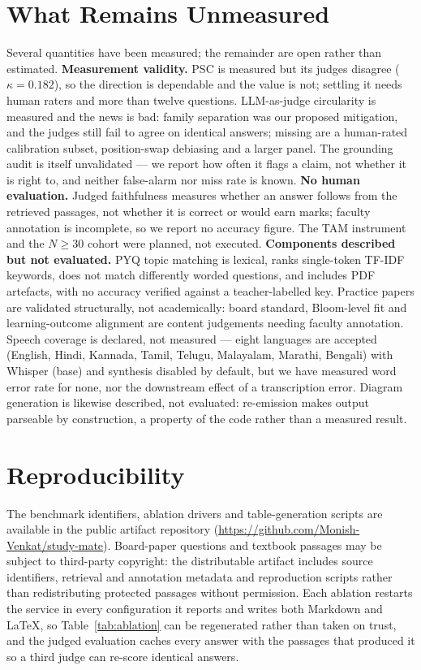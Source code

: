 \documentclass[conference]{IEEEtran}
\begin{document}
\section{What Remains Unmeasured}
\label{sec:limits}
Several quantities have been measured; the remainder are open rather than
estimated. \textbf{Measurement validity.} PSC is measured but its judges
disagree ($\kappa = 0.182$), so the direction is dependable and the value is
not; settling it needs human raters and more than twelve questions. LLM-as-judge
circularity is measured and the news is bad: family separation was our proposed
mitigation, and the judges still fail to agree on identical answers; missing are
a human-rated calibration subset, position-swap debiasing and a larger panel.
The grounding audit is itself unvalidated --- we report how often it flags a
claim, not whether it is right to, and neither false-alarm nor miss rate is
known. \textbf{No human evaluation.} Judged faithfulness measures whether an
answer follows from the retrieved passages, not whether it is correct or would
earn marks; faculty annotation is incomplete, so we report no accuracy figure.
The TAM instrument~\cite{davis1989} and the $N \geq 30$ cohort were planned, not
executed. \textbf{Components described but not evaluated.} PYQ topic matching is
lexical, ranks single-token TF-IDF keywords, does not match differently worded
questions, and includes PDF artefacts, with no accuracy verified against a
teacher-labelled key. Practice papers are validated structurally, not
academically: board standard, Bloom-level fit and learning-outcome alignment are
content judgements needing faculty annotation. Speech coverage is declared, not
measured --- eight languages are accepted (English, Hindi, Kannada, Tamil,
Telugu, Malayalam, Marathi, Bengali) with Whisper (base) and synthesis disabled
by default, but we have measured word error rate for none, nor the downstream
effect of a transcription error. Diagram generation is likewise described, not
evaluated: re-emission makes output parseable by construction, a property of the
code rather than a measured result.

\section{Reproducibility}
\label{sec:repro}
The benchmark identifiers, ablation drivers and table-generation scripts are
available in the public artifact repository
(\url{https://github.com/Monish-Venkat/study-mate}). Board-paper questions and
textbook passages may be subject to third-party copyright: the distributable
artifact includes source identifiers, retrieval and annotation metadata and
reproduction scripts rather than redistributing protected passages without
permission. Each ablation restarts the service in every configuration it reports
and writes both Markdown and \LaTeX{}, so Table~\ref{tab:ablation} can be
regenerated rather than taken on trust, and the judged evaluation caches every
answer with the passages that produced it so a third judge can re-score
identical answers.
\end{document}

